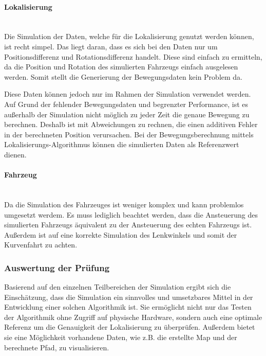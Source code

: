 \paragraph{Lokalisierung} \mbox{}\\
Die Simulation der Daten, welche für die Lokalisierung genutzt werden können, ist recht simpel.
Das liegt daran, dass es sich bei den Daten nur um Positionsdifferenz und Rotationsdifferenz handelt.
Diese sind einfach zu ermitteln, da die Position und Rotation des simulierten Fahrzeugs einfach ausgelesen werden.
Somit stellt die Generierung der Bewegungsdaten kein Problem da.

Diese Daten können jedoch nur im Rahmen der Simulation verwendet werden.
Auf Grund der fehlender Bewegungsdaten und begrenzter Performance, ist es außerhalb der Simulation nicht möglich zu jeder Zeit die genaue Bewegung zu berechnen. 
Deshalb ist mit Abweichungen zu rechnen, die einen additiven Fehler in der berechneten Position verursachen.
Bei der Bewegungsberechnung mittels Lokalisierungs-Algorithmus können die simulierten Daten als Referenzwert dienen.

\paragraph{Fahrzeug} \mbox{}\\
Da die Simulation des Fahrzeuges ist weniger komplex und kann problemlos umgesetzt werdem.
Es muss lediglich beachtet werden, dass die Ansteuerung des simulierten Fahrzeugs äquivalent zu der Ansteuerung des echten Fahrzeugs ist.
Außerdem ist auf eine korrekte Simulation des Lenkwinkels und somit der Kurvenfahrt zu achten.

\subsubsection{Auswertung der Prüfung}
Basierend auf den einzelnen Teilbereichen der Simulation ergibt sich die Einschätzung, 
dass die Simulation ein sinnvolles und umsetzbares Mittel in der Entwicklung einer solchen Algorithmik ist.
Sie ermöglicht nicht nur das Testen der Algorithmik ohne Zugriff auf physische Hardware, 
sondern auch eine optimale Referenz um die Genauigkeit der Lokalisierung zu überprüfen.
Außerdem bietet sie eine Möglichkeit vorhandene Daten, wie z.B. die erstellte Map und der berechnete Pfad, zu visualisieren.
  
\newpage
